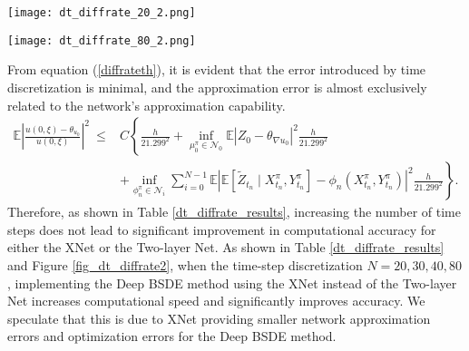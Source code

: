 \documentclass[11pt]{article}
\begin{document}
\begin{figure*}
	\centering
	\begin{minipage}[t]{0.5\linewidth}
		\centering
		\texttt{[image: dt\_diffrate\_20\_2.png]}
		\label{fig_dt_diffrate_80:first}
	\end{minipage}%
	\hfill
	\begin{minipage}[t]{0.5\linewidth}
		\centering
		\texttt{[image: dt\_diffrate\_80\_2.png]}
		\label{fig_dt_diffrate_80:second}
	\end{minipage}
	\vspace{-0.7cm}
	\centering
	\caption{Comparison of Two Network Architectures for Solving the PricingDiffrate Equation under 20-step-time Discretization and 80-step-time Discretization}
	\label{fig_dt_diffrate2}
\end{figure*}

From equation (\ref{diffrateth}), it is evident that the error introduced by time discretization is minimal, and the approximation error is almost exclusively related to the network's approximation capability.
\begin{equation}\label{diffrateth}
	\begin{aligned}
		\mathbb{E}\left|\frac{{u(0, \xi)-\theta_{{u_0}}}}{{u(0,\xi)}}  \right|^2\
		\leq &C\left\{ \frac{h}{21.299^2} +\inf _{\mu_0^\pi \in \mathcal{N}_0}  \mathbb{E}\left| Z_0-\theta_{\nabla{u_0}} \right|^2  \frac{h}{21.299^2} \right.\\
		&\left. +  \inf _{\phi_n^\pi \in \mathcal{N}_i} \sum_{i=0}^{N-1} \mathbb{E}\left|\mathbb{E}\left[\tilde{Z}_{t_n} \mid X_{t_n}^\pi, Y_{t_n}^\pi\right]-\phi_n\left(X_{t_n}^\pi, Y_{t_n}^\pi\right)\right|^2 \frac{h}{21.299^2}\right\}.
	\end{aligned}
\end{equation}
Therefore, as shown in Table \ref{dt_diffrate_results}, increasing the number of time steps does not lead to significant improvement in computational accuracy for either the XNet or the Two-layer Net.
As shown in Table \ref{dt_diffrate_results} and Figure \ref{fig_dt_diffrate2}, when the time-step discretization $N=20,30,40,80$, implementing the Deep BSDE method using the XNet instead of the Two-layer Net increases computational speed and significantly improves accuracy. We speculate that this is due to XNet providing smaller network approximation errors and optimization errors for the Deep BSDE method.
\end{document}
